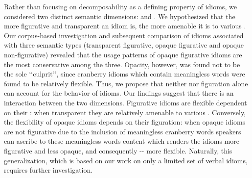 \documentclass[output=paper]{langsci/langscibook}
\begin{document}
Rather\ili{} than\ili{} focusing\ili{} on\ili{} decomposability\ili{} as\ili{} a\ili{} defining\ili{} property\ili{} of\ili{} idioms\ili{},\ili{} we\ili{} considered\ili{} two\ili{} distinct\ili{} semantic\ili{} dimensions\ili{}:\ili{} \ili{} and\ili{} \ili{}.\ili{} We\ili{} hypothesized\ili{} that\ili{} the\ili{} more\ili{} figurative\ili{} and\ili{} transparent\ili{} an\ili{} idiom\ili{} is\ili{},\ili{} the\ili{} more\ili{} amenable\ili{} it\ili{} is\ili{} to\ili{} various\ili{} \ili{}\isi{}\ili{}.\ili{} Our\ili{} corpus\ili{}-based\ili{} investigation\ili{} and\ili{} subsequent\ili{} comparison\ili{} of\ili{} idioms\ili{} associated\ili{} with\ili{} three\ili{} semantic\ili{} types\ili{} \ili{}(transparent\ili{} figurative\ili{},\ili{} opaque\ili{} figurative\ili{} and\ili{} opaque\ili{} non\ili{}-figurative\ili{})\ili{} revealed\ili{} that\ili{} the\ili{} usage\ili{} patterns\ili{} of\ili{} opaque\ili{} figurative\ili{} idioms\ili{} are\ili{} the\ili{} most\ili{} conservative\ili{} among\ili{} the\ili{} three\ili{}.\ili{}
\ili{}
Opacity\ili{},\ili{} however\ili{},\ili{} was\ili{} found\ili{} not\ili{} to\ili{} be\ili{} the\ili{} sole\ili{} \ili{}`\ili{}`culprit\ili{}'\ili{}'\ili{},\ili{} since\ili{} cranberry\ili{} idioms\ili{} which\ili{} contain\ili{} meaningless\ili{} words\ili{} were\ili{} found\ili{} to\ili{} be\ili{} relatively\ili{} flexible\ili{}.\ili{} Thus\ili{},\ili{} we\ili{} propose\ili{} that\ili{} neither\ili{} \ili{}\isi{}\ili{} nor\ili{} figuration\ili{} alone\ili{} can\ili{} account\ili{} for\ili{} the\ili{} behavior\ili{} of\ili{} idioms\ili{}.\ili{} Our\ili{} findings\ili{} suggest\ili{} that\ili{} there\ili{} is\ili{} an\ili{} interaction\ili{} between\ili{} the\ili{} two\ili{} dimensions\ili{}.\ili{} Figurative\ili{} idioms\ili{} are\ili{} flexible\ili{} dependent\ili{} on\ili{} their\ili{} \ili{}\isi{}\ili{}:\ili{} when\ili{} transparent\ili{} they\ili{} are\ili{} relatively\ili{} amenable\ili{} to\ili{} various\ili{} \ili{}\isi{}\ili{}.\ili{} Conversely\ili{},\ili{} the\ili{} flexibility\ili{} of\ili{} opaque\ili{} idioms\ili{} depends\ili{} on\ili{} their\ili{} figuration\ili{}:\ili{} when\ili{} opaque\ili{} idioms\ili{} are\ili{} not\ili{} figurative\ili{} due\ili{} to\ili{} the\ili{} inclusion\ili{} of\ili{} meaningless\ili{} cranberry\ili{} words\ili{} speakers\ili{} can\ili{} ascribe\ili{} to\ili{} these\ili{} meaningless\ili{} words\ili{} content\ili{} which\ili{} renders\ili{} the\ili{} idioms\ili{} more\ili{} figurative\ili{} and\ili{} less\ili{} opaque\ili{},\ili{} and\ili{} consequently\ili{} \ili{}-\ili{}-\ili{} more\ili{} flexible\ili{}.\ili{} Naturally\ili{},\ili{} this\ili{} generalization\ili{},\ili{} which\ili{} is\ili{} based\ili{} on\ili{} our\ili{} work\ili{} on\ili{} only\ili{} a\ili{} limited\ili{} set\ili{} of\ili{} \ili{}\ili{}\ili{} verbal\ili{} idioms\ili{},\ili{} requires\ili{} further\ili{} investigation\ili{}.\ili{}
\end{document}
